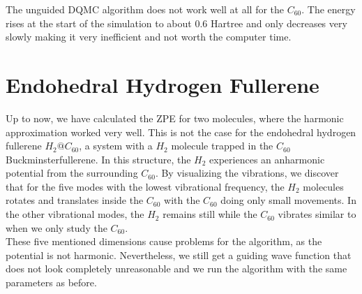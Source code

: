\documentclass [12pt]{report}
\begin{document}
The unguided DQMC algorithm does not work well at all for the $C_{60}$. The energy rises at the start of the simulation to about 0.6 Hartree and only decreases very  slowly making it very inefficient and not worth the computer time.

\section{Endohedral Hydrogen Fullerene}
Up to now, we have calculated the ZPE for two molecules, where the harmonic approximation worked very well. This is not the case for the endohedral hydrogen fullerene $H_2@C_{60}$, a system with a $H_2$ molecule trapped in the $C_{60}$ Buckminsterfullerene. In this structure, the $H_2$ experiences an anharmonic potential from the surrounding $C_{60}$. By visualizing the vibrations, we discover that for the five modes with the lowest vibrational frequency, the $H_2$ molecules rotates and translates inside the $C_{60}$ with the $C_{60}$ doing only small movements. In the other vibrational modes, the $H_2$ remains still while the $C_{60}$ vibrates similar to when we only study the $C_{60}$.\\
These five mentioned dimensions cause problems for the algorithm, as the potential is not harmonic. Nevertheless, we still get a guiding wave function that does not look completely unreasonable and we run the algorithm with the same parameters as before.
\end{document}
